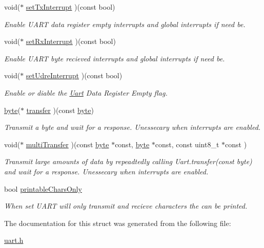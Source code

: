 \begin{DoxyCompactItemize}
void($\ast$ \hyperlink{a00018_ga2c0c4fa765ead8abb7d84dcf6f39dbc2}{set\-Tx\-Interrupt} )(const bool)
\begin{DoxyCompactList}\small\item\em Enable U\-A\-R\-T data register empty interrupts and global interrupts if need be. \end{DoxyCompactList}\item 
void($\ast$ \hyperlink{a00018_gadc49d7eacb5b108a10e3a940bd2db9b7}{set\-Rx\-Interrupt} )(const bool)
\begin{DoxyCompactList}\small\item\em Enable U\-A\-R\-T byte recieved interrupts and global interrupts if need be. \end{DoxyCompactList}\item 
void($\ast$ \hyperlink{a00018_gacfecb860e1dfd5b7bd9523fccb7e9f1e}{set\-Udre\-Interrupt} )(const bool)
\begin{DoxyCompactList}\small\item\em Enable or diable the \hyperlink{a00009}{Uart} Data Register Empty flag. \end{DoxyCompactList}\item 
\hyperlink{a00011_a82b52bf2b45e214a8f2100ebfdf1aee4}{byte}($\ast$ \hyperlink{a00018_ga2c78990dd8babc3210665befa7ed7e4c}{transfer} )(const \hyperlink{a00011_a82b52bf2b45e214a8f2100ebfdf1aee4}{byte})
\begin{DoxyCompactList}\small\item\em Transmit a byte and wait for a response. Unessecary when interrupts are enabled. \end{DoxyCompactList}\item 
void($\ast$ \hyperlink{a00018_ga10aaaa60575c35598ae7033beafb5828}{multi\-Transfer} )(const \hyperlink{a00011_a82b52bf2b45e214a8f2100ebfdf1aee4}{byte} $\ast$const, \hyperlink{a00011_a82b52bf2b45e214a8f2100ebfdf1aee4}{byte} $\ast$const, const uint8\-\_\-t $\ast$const )
\begin{DoxyCompactList}\small\item\em Transmit large amounts of data by repeadtedly calling Uart.\-transfer(const byte) and wait for a response. Unessecary when interrupts are enabled. \end{DoxyCompactList}\item 
bool \hyperlink{a00018_ga715d9d9174c62b5682150875555dac96}{printable\-Chars\-Only}
\begin{DoxyCompactList}\small\item\em When set U\-A\-R\-T will only transmit and recieve characters the can be printed. \end{DoxyCompactList}\end{DoxyCompactItemize}


The documentation for this struct was generated from the following file\-:\begin{DoxyCompactItemize}
\item 
\hyperlink{a00016}{uart.\-h}\end{DoxyCompactItemize}

